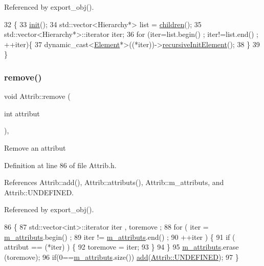 Referenced by export\+\_\+obj().


\begin{DoxyCode}
32                                   \{
33   \hyperlink{classElement_af42754b5cabc198869222725218d695c}{init}();
34   std::vector<Hierarchy*> list = \hyperlink{classHierarchy_aa9a76f69e98e052ee1a6e32cea006288}{children}();
35   std::vector<Hierarchy*>::iterator iter;
36   \textcolor{keywordflow}{for} (iter=list.begin() ; iter!=list.end() ; ++iter)\{
37     \textcolor{keyword}{dynamic\_cast<}\hyperlink{classElement}{Element}*\textcolor{keyword}{>}((*iter))->\hyperlink{classElement_a3c0abcb36f8906688bb7e32608df7086}{recursiveInitElement}();
38   \}
39 \}
\end{DoxyCode}
\mbox{\label{classAttrib_a7d4ef7e32d93cb287792b87b857e79f3}} 
\subsubsection{\texorpdfstring{remove()}{remove()}}
{\footnotesize\ttfamily void Attrib\+::remove (\begin{DoxyParamCaption}\item[{int}]{attribut }\end{DoxyParamCaption})\hspace{0.3cm}{\ttfamily [inline]}, {\ttfamily [inherited]}}

Remove an attribut 

Definition at line 86 of file Attrib.\+h.



References Attrib\+::add(), Attrib\+::attributs(), Attrib\+::m\+\_\+attributs, and Attrib\+::\+U\+N\+D\+E\+F\+I\+N\+ED.



Referenced by export\+\_\+obj().


\begin{DoxyCode}
86                                \{
87     std::vector<int>::iterator iter , toremove ;
88     \textcolor{keywordflow}{for} ( iter  = \hyperlink{classAttrib_ac4bd58a0cc6b38a3b711d609a3d3aacc}{m\_attributs}.begin() ;
89           iter != \hyperlink{classAttrib_ac4bd58a0cc6b38a3b711d609a3d3aacc}{m\_attributs}.end()   ;
90           ++iter ) \{
91       \textcolor{keywordflow}{if} ( attribut == (*iter) ) \{
92         toremove = iter;
93       \}
94     \}
95     \hyperlink{classAttrib_ac4bd58a0cc6b38a3b711d609a3d3aacc}{m\_attributs}.erase (toremove);
96     \textcolor{keywordflow}{if}(0==\hyperlink{classAttrib_ac4bd58a0cc6b38a3b711d609a3d3aacc}{m\_attributs}.size()) \hyperlink{classAttrib_a235f773af19c900264a190b00a3b4ad7}{add}(\hyperlink{classAttrib_a69e171d7cc6417835a5a306d3c764235a3a8da2ab97dda18aebab196fe4100531}{Attrib::UNDEFINED});
97   \}
\end{DoxyCode}
\mbox{\label{classFEB__v1_a4e147b894ecbf4b05b92d01270d7ff13}} 
